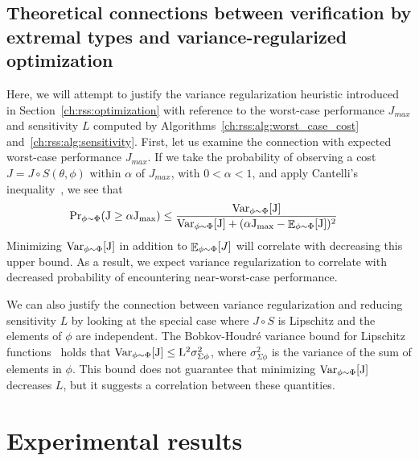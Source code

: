 \subsection{Theoretical connections between verification by extremal types and variance-regularized optimization}\label{ch:rss:connection_to_robustness}

Here, we will attempt to justify the variance regularization heuristic introduced in Section~\ref{ch:rss:optimization} with reference to the worst-case performance $J_{max}$ and sensitivity $L$ computed by Algorithms~\ref{ch:rss:alg:worst_case_cost} and~\ref{ch:rss:alg:sensitivity}. First, let us examine the connection with expected worst-case performance $J_{max}$. If we take the probability of observing a cost $J = J\circ S(\theta, \phi)$ within $\alpha$ of $J_{max}$, with $0 < \alpha < 1$, and apply Cantelli's inequality~\cite{boucheron_lugosi_massart_2016}, we see that
\begin{align*}
	\rm{Pr}_{\phi \sim \Phi}(J \geq \alpha J_{max}) & \leq \frac{\rm{Var}_{\phi \sim \Phi}[J]}{\rm{Var}_{\phi \sim \Phi}[J] + (\alpha J_{max} - \mathop{\mathbb{E}}_{\phi \sim \Phi}[J])^2}
\end{align*}
Minimizing $\rm{Var}_{\phi \sim \Phi}[J]$ in addition to $\mathop{\mathbb{E}}_{\phi \sim \Phi}[J]$ will correlate with decreasing this upper bound. As a result, we expect variance regularization to correlate with decreased probability of encountering near-worst-case performance.

We can also justify the connection between variance regularization and reducing sensitivity $L$ by looking at the special case where $J \circ S$ is Lipschitz and the elements of $\phi$ are independent. The Bobkov-Houdr\'e variance bound for Lipschitz functions~\cite{bobkov} holds that $\rm{Var}_{\phi \sim \Phi}[J] \leq L^2 \sigma_{\Sigma\phi}^2$,
where $\sigma_{\Sigma\phi}^2$ is the variance of the sum of elements in $\phi$. This bound does not guarantee that minimizing $\rm{Var}_{\phi \sim \Phi}[J]$ decreases $L$, but it suggests a correlation between these quantities.

\section{Experimental results}\label{ch:rss:cases}

